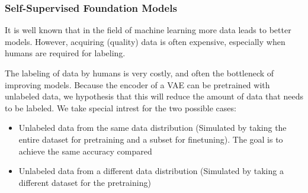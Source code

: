 \subsubsection{Self-Supervised Foundation Models}
It is well known that in the field of machine learning more data leads to better models. However, acquiring (quality) data is often expensive, especially when humans are required for labeling.

The labeling of data by humans is very costly, and often the bottleneck of improving models. Because the encoder of a VAE can be pretrained with unlabeled data, we hypothesis that this will reduce the amount of data that needs to be labeled. We take special intrest for the two possible cases:
\begin{itemize}
    \item Unlabeled data from the same data distribution (Simulated by taking the entire dataset for pretraining and a subset for finetuning). The goal is to achieve the same accuracy compared
    \item Unlabeled data from a different data distribution (Simulated by taking a different dataset for the pretraining)
\end{itemize}
